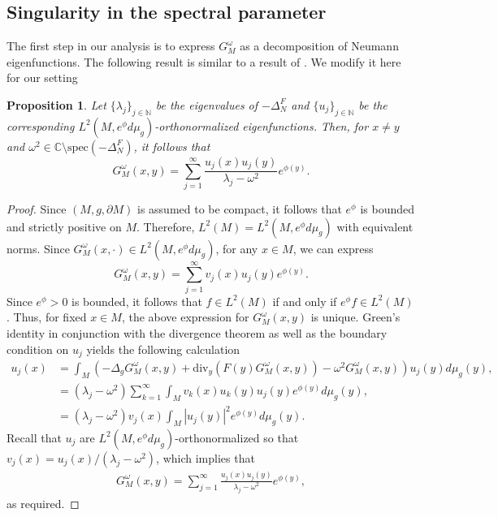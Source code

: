 \documentclass[12pt,a4paper]{amsart}
\numberwithin{equation}{section}
\theoremstyle{plain}
\newtheorem{proposition}[theorem]{Proposition}
\theoremstyle{definition}
\begin{document}
\subsection{Singularity in the spectral parameter}
The first step in our analysis is to express $G_M^\omega$ as a decomposition of Neumann eigenfunctions. The following result is similar to a result of \cite{HHHmonog}. We modify it here for our setting
	\begin{proposition}\label{sing on omega}
		Let $\{\lambda_j\}_{j\in \mathbb{N}}$ be the eigenvalues of $-\Delta_N^F$ and $\{u_j\}_{j\in \mathbb{N}}$  be the corresponding  $L^2(M,e^\phi d\mu_g)$-orthonormalized eigenfunctions. Then, for $x\neq y$ and $\omega^2\in\mathbb{C}\setminus \mathrm{spec}(-\Delta_N^F)$, it follows that
		\begin{equation*}
			G_M^\omega(x,y) = \sum_{j=1}^\infty \frac{u_j(x)u_j(y)}{\lambda_j-\omega^2}e^{\phi(y)}.
		\end{equation*}
	\end{proposition}
\begin{proof}
		Since $(M,g,\partial M)$ is assumed to be compact, it follows that $e^\phi$ is bounded and strictly positive on $M$. Therefore, $L^2(M) = L^2(M,e^\phi d\mu_g)$ with equivalent norms. Since $G_M^\omega(x,\cdot)  \in L^2(M,e^\phi d\mu_g)$, for any $x\in M$, we can express 
		\begin{equation*}
			G_M^\omega(x,y) = \sum_{j=1}^\infty v_j(x) u_j(y) e^{\phi(y)}.
		\end{equation*}
		Since $e^\phi >0$ is bounded, it follows that $f\in L^2(M)$ if and only if $e^\phi f\in L^2(M)$. Thus, for fixed $x\in M$, the above expression for $G_M^\omega(x,y)$ is unique. Green's identity in conjunction with the divergence theorem as well as the boundary condition on $u_j$ yields the following calculation
		\begin{align*}
			u_j(x) &= \int_M \left(-\Delta_g G_M^\omega(x,y) + \text{div}_y(F(y)G_M^\omega(x,y)) - \omega^2G_M^\omega(x,y)\right)u_j(y) d\mu_g(y),\\
			&= (\lambda_j-\omega^2) \sum_{k=1}^\infty \int_M v_k(x) u_k(y) u_j(y) e^{\phi(y)} d\mu_g(y), \\ 
			&= (\lambda_j - \omega^2) v_j(x) \int_M |u_j(y)|^2 e^{\phi(y)} d\mu_g(y). 
		\end{align*}
		Recall that $u_j$ are $L^2(M,e^\phi d\mu_g)$-orthonormalized so that $v_j(x) = u_j(x)/(\lambda_j-\omega^2)$, which implies that 
		\begin{align*}
			G_M^\omega(x,y) = \sum_{j = 1}^\infty \frac{u_j(x)u_j(y)}{\lambda_j-\omega^2}e^{\phi(y)},
		\end{align*}
		as required. 
	\end{proof}
\end{document}
